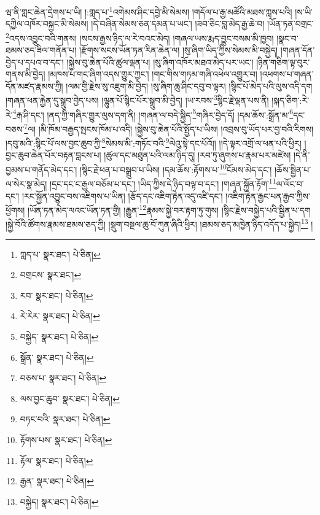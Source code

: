 ཝ་ནི་གླང་ཆེན་དྲེགས་པ་ཡི། །:གླད་པ་\footnote{ཀླད་པ་  སྣར་ཐང་།  པེ་ཅིན། }འགེམས་ཤིང་དབྱེ་མི་སེམས། །གདོལ་པ་རྒྱ་མཚོའི་མཐས་ཀླས་པའི། །ས་ཡི་དཀྱིལ་འཁོར་བསྐྱང་མི་སེམས། །དེ་བཞིན་སེམས་ཅན་དམན་པ་ཡང་། །ཟབ་ཅིང་བླ་མེད་རྒྱ་ཆེ་བ། །ཡོན་ཏན་བགྲང་\footnote{བགྲངས་  སྣར་ཐང་། }འདས་འབྱུང་བའི་གནས། །སངས་རྒྱས་ཉིད་ལ་རེ་བའང་མེད། །གཞལ་ཡས་རྨད་བྱུང་བསམ་མི་ཁྱབ། །སྣང་བ་ཐམས་ཅད་ཟིལ་གནོན་པ། །རྫོགས་སངས་ཡོན་ཏན་རིན་ཆེན་ལ། །སུ་ཞིག་ཡིད་ཀྱིས་སེམས་མི་བསྐྱེད། །གཞན་དོན་བྱེད་པ་དཔའ་བ་དང་། །སྐྱེས་བུ་ཆེན་པོའི་ཚུལ་ལྡན་པ། །སུ་ཞིག་འཁོར་མཐའ་མེད་པར་ཡང་། །ཉིན་གཅིག་ལྟ་བུར་གནས་མི་བྱེད། །མཁས་པ་གང་ཞིག་འདས་གྱུར་ཀྱང་། །གང་གིས་གཏམ་གཞི་འཕེལ་འགྱུར་བ། །འཕགས་པ་གཞན་དོན་མཛད་རྣམས་ཀྱི། །ལམ་གྱི་རྗེས་སུ་འཇུག་མི་བྱེད། །སུ་ཞིག་ཆུ་ཤིང་དབུ་བ་ལྟར། །སྙིང་པོ་མེད་པའི་ལུས་འདི་དག །གཞན་ཕན་རྐྱེན་དུ་སྒྲུབ་བྱེད་པས། །ལྷུན་པོ་སྙིང་པོར་སྒྲུབ་མི་བྱེད། །ཡ་རབས་\footnote{རབ་  སྣར་ཐང་།  པེ་ཅིན། }སྙིང་རྗེ་ལྡན་པས་ནི། །སྐད་ཅིག་:རེ་རེ་\footnote{རེ་རེར་  སྣར་ཐང་།  པེ་ཅིན། }རྒ་ཤི་དང་། །ནད་ཀྱི་གཞིར་གྱུར་ལུས་དག་ནི། །གཞན་ལ་བདེ་སྐྱིད་\footnote{བསྐྱེད་  སྣར་ཐང་།  པེ་ཅིན། }གཞིར་བྱེད་དོ། །དམ་ཆོས་:སྒྲོན་མ་\footnote{སྒྲོན་  སྣར་ཐང་།  པེ་ཅིན། }དང་བཅས་\footnote{བཅས་པ་  སྣར་ཐང་།  པེ་ཅིན། }ལ། །མི་ཁོམ་བརྒྱད་སྤངས་ཁོམ་པ་འདི། །སྐྱེས་བུ་ཆེན་པོའི་སྤྱོད་པ་ཡིས། །འབྲས་བུ་ཡོད་པར་བྱ་བའི་རིགས། །དབུ་མའི་:སྙིང་པོ་ལས་བྱང་ཆུབ་ཀྱི་\footnote{ལས་བྱང་ཆུབ་  སྣར་ཐང་།  པེ་ཅིན། }སེམས་མི་:གཏོང་བའི་\footnote{བཏང་བའི་  སྣར་ཐང་།  པེ་ཅིན། }ལེའུ་སྟེ་དང་པོའོ།། །།དེ་ལྟར་འགྲོ་ལ་ཕན་པའི་ཕྱིར། །བྱང་ཆུབ་ཆེན་པོར་བརྟན་བླངས་པ། །ཚུལ་དང་མཐུན་པའི་ལམ་ཉིད་དུ། །རབ་ཏུ་ཞུགས་པ་རྣམ་པར་མཛེས། །དེ་ནི་བྱམས་པ་གནོད་མེད་དང་། །སྙིང་རྗེ་ཕན་པ་བསྒྲུབ་པ་ཡིས། །དམ་ཆོས་:རྟོགས་པ་\footnote{རྟོགས་པས་  སྣར་ཐང་།  པེ་ཅིན། }ངོམས་མེད་དང་། །ཆོས་སྦྱིན་པ་ལ་སེར་སྣ་མེད། །དྲང་དང་ང་རྒྱལ་བཅོམ་པ་དང་། །ཡིད་ཀྱིས་དེ་ཉིད་བལྟ་བ་དང་། །གཞན་སྐྱོན་རྟོག་\footnote{རྟོལ་  སྣར་ཐང་།  པེ་ཅིན། }ལ་ལོང་བ་དང་། །རང་སྐྱོན་འབྱུང་བས་འཇིགས་པ་ཡིན། །རྩོད་དང་འཇིག་རྟེན་འདུ་འཛི་དང་། །འཇིག་རྟེན་རྒྱང་པན་རྒྱབ་ཀྱིས་ཕྱོགས། །ཡོན་ཏན་མེད་ལའང་ཡོན་ཏན་གྱི། །རྒྱུན་\footnote{རྒྱན་  སྣར་ཐང་།  པེ་ཅིན། }རྣམས་སྐྱེ་བར་རྟག་ཏུ་གུས། །སྙིང་རྗེས་བསྐྱེད་པའི་སྦྱིན་པ་དག །སྐྱེ་བོའི་ཚོགས་རྣམས་ཐམས་ཅད་ཀྱི། །སྡུག་བསྔལ་ཆུ་བོ་ཀུན་ཞིའི་ཕྱིར། །ཐམས་ཅད་མཁྱེན་ཉིད་འདོད་པ་སྐྱེད།\footnote{བསྐྱེད།  སྣར་ཐང་།  པེ་ཅིན། } །
